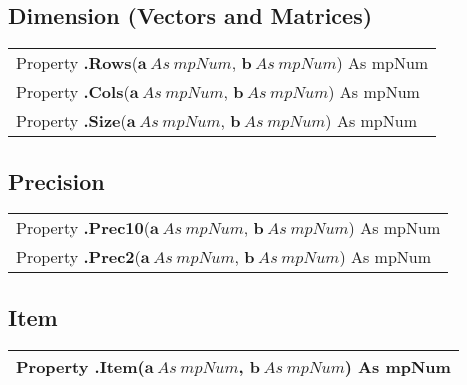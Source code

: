 \subsection{Dimension (Vectors and Matrices)}
\begin{tabular}{p{481pt}}
	\toprule
	\textsf{Property \textbf{.Rows}($\boldsymbol{a}\ As\ mpNum$, $\boldsymbol{b}\ As\ mpNum$) As mpNum}\index{Multiprecision Properties!.Rows} \\
	\textsf{Property \textbf{.Cols}($\boldsymbol{a}\ As\ mpNum$, $\boldsymbol{b}\ As\ mpNum$) As mpNum}\index{Multiprecision Properties!.Cols} \\
	\textsf{Property \textbf{.Size}($\boldsymbol{a}\ As\ mpNum$, $\boldsymbol{b}\ As\ mpNum$) As mpNum}\index{Multiprecision Properties!.Size} \\
	\bottomrule
\end{tabular}

\vspace{0.3cm}
\lipsum[2]



\subsection{Precision}
\begin{tabular}{p{481pt}}
	\toprule
	\textsf{Property \textbf{.Prec10}($\boldsymbol{a}\ As\ mpNum$, $\boldsymbol{b}\ As\ mpNum$) As mpNum}\index{Multiprecision Properties!.Prec10} \\
	\textsf{Property \textbf{.Prec2}($\boldsymbol{a}\ As\ mpNum$, $\boldsymbol{b}\ As\ mpNum$) As mpNum}\index{Multiprecision Properties!.Prec2} \\
	\bottomrule
\end{tabular}

\vspace{0.3cm}
\lipsum[2]



\subsection{Item}
\begin{tabular}{p{481pt}}
	\toprule
	\textsf{Property \textbf{.Item}($\boldsymbol{a}\ As\ mpNum$, $\boldsymbol{b}\ As\ mpNum$) As mpNum}\index{Multiprecision Properties!.Item} \\
	\bottomrule
\end{tabular}

\vspace{0.3cm}
\lipsum[2]



